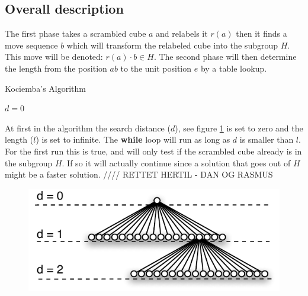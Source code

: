 \subsection{Overall description}
\label{sub:overallDescription}
The first phase takes a scrambled cube $a$ and relabels it $r(a)$ then it finds a move sequence $b$ which will transform the relabeled cube into the subgroup $H$. This move will be denoted: $r(a)\cdot{}b \in H$. The second phase will then determine the length from the position $ab$ to the unit position $e$ by a table lookup. 


\begin{algorithm}[!h]                     
\caption{Kociemba's Algorithm \cite{rokicki09}}          
\label{alg:kociemba}        
\begin{algorithmic}[1]
\STATE $d=0$
			\ENDIF
		\ENDIF
	\ENDFOR
\ENDWHILE
\end{algorithmic}
\end{algorithm}

At first in the algorithm the search distance ($d$), see figure \ref{fig:searchExpansion} is set to zero and the length ($l$) is set to infinite. The \textbf{while} loop will run as long as $d$ is smaller than $l$. For the first run this is true, and will only test if the scrambled cube already is in the subgroup $H$. If so it will actually continue since a solution that goes out of $H$ might be a faster solution. 
//// RETTET HERTIL - DAN OG RASMUS \cite{cubelowers92} 
\begin{figure}[!hb]
	\centering
		\includegraphics[scale=0.75]{input/pics/searchExpansion.pdf}
	\caption{}
	\label{fig:searchExpansion}
\end{figure}

